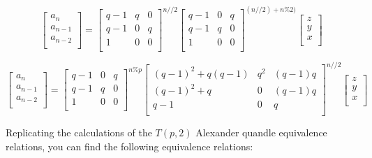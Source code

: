 \documentclass[paper.tex]{subfiles}
\begin{document}
\[ 
\left[ \begin{array}{ccc}
a_{n} \\
a_{n-1} \\
a_{n-2} \\
\end{array} \right] 
=
\left[ \begin{array}{ccc}
q-1 & q & 0 \\
q-1 & 0 & q \\
1 & 0 & 0 \\
\end{array} \right] ^{n//2} 
\left[ \begin{array}{ccc}
q-1 & 0 & q \\
q-1 & q & 0 \\
1 & 0 & 0 \\
\end{array} \right] ^{(n//2) + n\%2)}
\left[ \begin{array}{ccc}
z \\
y \\
x \\
\end{array} \right] 
\] 

\[ 
\left[ \begin{array}{ccc}
a_{n} \\
a_{n-1} \\
a_{n-2} \\
\end{array} \right] 
=
\left[ \begin{array}{ccc}
q-1 & 0 & q \\
q-1 & q & 0 \\
1 & 0 & 0 \\
\end{array} \right] ^{n\%p}
\left[ \begin{array}{ccc}
(q-1)^{2} + q(q-1) & q^{2} & (q-1)q \\
(q-1)^{2} + q & 0 & (q-1)q \\
q-1 & 0 & q \\
\end{array} \right] ^{n//2} 
\left[ \begin{array}{ccc}
z \\
y \\
x \\
\end{array} \right] 
\] 

Replicating the calculations of the $T(p,2)$ Alexander quandle equivalence relations, you can find the following equivalence relations:
\end{document}
